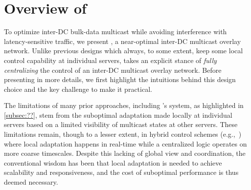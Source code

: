 \section{Overview of \name}
\label{sec:overview}

To optimize inter-DC bulk-data multicast while avoiding
interference with latency-sensitive traffic, we present \name,
a near-optimal inter-DC multicast overlay network.
Unlike previous designs which always, to some extent, keep 
some local control capability at individual servers,
\name takes an explicit stance of {\em fully centralizing} the 
control of an inter-DC multicast overlay network. 
Before presenting \name in more details, 
we first highlight the intuitions behind this design 
choice and the key challenge to make it practical.







The limitations of many prior approaches, including \company's 
system, as highlighted in \Section\ref{subsec:??},
stem from the suboptimal adaptation made locally 
at individual servers 
based on a limited visibility of multicast states at
other servers. 
These limitations remain, though to a lesser extent, in hybrid
control schemes (e.g.,~\cite{vdn}) where local 
adaptation happens in real-time while a centralized logic
operates on more coarse timescales.
Despite this lacking of global view and coordination, the 
conventional wisdom has 
been that local adaptation is needed to achieve 
scalability and responsiveness, and the cost of suboptimal 
performance is thus deemed necessary.


